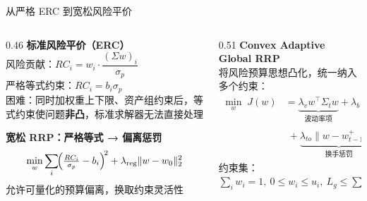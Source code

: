 \documentclass[aspectratio=169,11pt]{beamer}
\begin{document}
\begin{frame}{从严格 ERC 到宽松风险平价}
  \begin{columns}[T]
    \begin{column}{0.46\textwidth}
      \textbf{标准风险平价（ERC）}\\[0.2em]
      风险贡献：$RC_i = w_i \cdot \dfrac{(\Sigma w)_i}{\sigma_p}$\\[0.4em]
      严格等式约束：$RC_i = b_i \sigma_p$\\[0.4em]
      \alert{困难}：同时加权重上下限、资产组约束后，等式约束使问题\textbf{非凸}，标准求解器无法直接处理

      \vspace{0.6em}
      \textbf{宽松 RRP：严格等式 → 偏离惩罚}
      \[
        \min_w \sum_i \!\Bigl(\tfrac{RC_i}{\sigma_p} - b_i\Bigr)^{\!2}
        + \lambda_{\text{reg}}\|w - w_0\|_2^2
      \]
      允许可量化的预算偏离，换取约束灵活性
    \end{column}
    \begin{column}{0.51\textwidth}
      \textbf{Convex Adaptive Global RRP}\\[0.3em]
      将风险预算思想凸化，统一纳入多个约束：
      \small
      \begin{align*}
        \min_w\; J(w)
          &= \underbrace{\lambda_v w^\top\Sigma_t w}_{\text{波动率项}}
           + \underbrace{\lambda_b\|w - b_t\|_2^2}_{\text{预算偏离}} \\[2pt]
          &\;+ \underbrace{\lambda_{to}\|w - w_{t-1}^+\|_1}_{\text{换手惩罚}}
           + \underbrace{\lambda_c\,\mathrm{CVaR}_\alpha(w)}_{\text{尾部约束}}
           - \underbrace{\lambda_r\,\mu_t^\top w}_{\text{收益奖励}}
      \end{align*}
      \normalsize
      \vspace{0.1em}
      约束集：$\sum_i w_i=1,\ 0\le w_i\le u_i,\ L_g\le\sum_{i\in g}w_i\le U_g$
    \end{column}
  \end{columns}
\end{frame}
\end{document}
